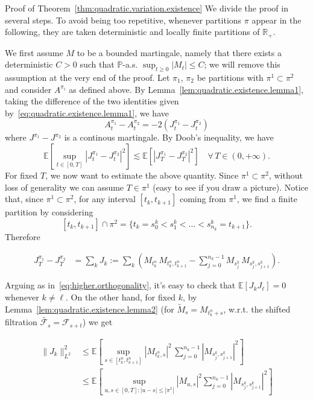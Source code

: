 \documentclass{article}
\newcommand{\coloneq}{:=}
\newcommand{\textbf}[1]{\text{{\bfseries{#1}}}}
\newenvironment{proof*}[1]{\noindent\textbf{#1\ }}{\hspace*{\fill}$\Box$\medskip}
\newcommand{\1}{\1}
\begin{document}
{\begin{proof*}{Proof of Theorem~\ref{thm:quadratic.variation.existence}}
  We divide the proof in several steps. To avoid being too repetitive,
  whenever partitions $\pi$ appear in the following, they are taken
  deterministic and locally finite partitions of $\mathbb{R}_+$.
  
  \textbf{Step 1.} We first assume $M$ to be a bounded martingale, namely
  that there exists a deterministic $C > 0$ such that $\mathbb{P}$-a.s.
  $\sup_{t \geqslant 0}  | M_t | \leqslant C$; we will remove this assumption
  at the very end of the proof. Let $\pi_1$, $\pi_2$ be partitions with $\pi^1
  \subset \pi^2$ and consider $A^{\pi_i}$ as defined above. By
  Lemma~\ref{lem:quadratic.existence.lemma1}, taking the difference of the two
  identities given by~\eqref{eq:quadratic.existence.lemma1}, we have
  \[ A^{\pi_1}_t - A^{\pi_2}_t = - 2 (J^{\pi_1}_t - J^{\pi_2}_t) \]
  where $J^{\pi_1} - J^{\pi_2}$ is a continous martingale. By Doob's
  inequality, we have
  \[ \mathbb{E} [\sup_{t \in [0, T]} | J^{\pi_1}_t - J^{\pi_2}_t |^2] \lesssim
     \mathbb{E} [| J^{\pi_1}_T - J^{\pi_2}_T |^2]  \quad \forall \, T \in (0,
     + \infty) . \]
  {\hspace{1.5em}}\textbf{Step 2.} For fixed $T$, we now want to estimate
  the above quantity. Since $\pi^1 \subset \pi^2$, without loss of generality
  we can assume $T \in \pi^1$ (easy to see if you draw a picture). Notice
  that, since $\pi^1 \subset \pi^2$, for any interval $[t_k, t_{k + 1}]$
  coming from $\pi^1$, we find a finite partition by considering
  \[ [t_k, t_{k + 1}] \cap \pi^2 = \{ t_k = s^k_0 < s^k_1 < \ldots < s^k_{n_k}
     = t_{k + 1} \} . \]
  Therefore
  
  \begin{align*}
    J^{\pi_1}_T - J^{\pi_2}_T & = \sum_k J_k \coloneq \sum_k \left( M_{t^n_k}
    \, M_{t^n_k, t^n_{k + 1}} - \sum_{j = 0}^{n_k - 1} M_{s^k_j} \, M_{s^k_j,
    s^k_{j + 1}} \right) .
  \end{align*}
  
  Arguing as in~\eqref{eq:higher.orthogonality}, it's easy to check that
  $\mathbb{E} [J_k J_{\ell}] = 0$ whenever $k \neq \ell$. On the other hand,
  for fixed $k$, by Lemma~\ref{lem:quadratic.existence.lemma2} (for
  $\tilde{M}_s = M_{t^n_k + s}$, w.r.t. the shifted filtration
  $\widetilde{\mathcal{F}_s} = \mathcal{F}_{s + t}$) we get
  
  \begin{align*}
    \| J_k \|_{L^2}^2 & \leqslant \mathbb{E} \left[ \sup_{s \in [t^n_k, t^n_{k
    + 1}]} | M_{t^n_k, s} |^2 \, \sum_{j = 0}^{n_k - 1} | M_{s^k_j, s^k_{j +
    1}} |^2 \right]\\
    & \leqslant \mathbb{E} \left[ \sup_{u, s \in [0, T] : | u - s | \leqslant
    | \pi^1 |}   | M_{u, s} |^2  \sum_{j = 0}^{n_k - 1} | M_{s^k_j, s^k_{j +
    1}} |^2 \right]
  \end{align*}
  

\end{proof*}}
\end{document}
